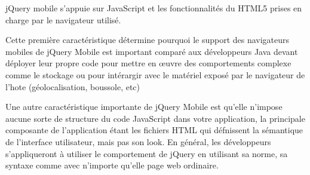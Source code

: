 jQuery mobile s’appuie sur JavaScript et les fonctionnalités du HTML5 prises en charge par le navigateur utilisé.

Cette première caractéristique détermine pourquoi le support des navigateurs mobiles de jQuery Mobile est important comparé aux développeurs Java devant déployer leur propre code pour mettre en œuvre des comportements complexe comme le stockage ou pour intérargir avec le matériel exposé par le navigateur de l’hote (géolocalisation, boussole, etc)

Une autre caractéristique importante de jQuery Mobile est qu’elle n’impose aucune sorte de structure du code JavaScript dans votre application, la principale composante de l’application étant les fichiers HTML qui défnissent la sémantique de l’interface utilisateur, mais pas son look. En général, les développeurs s’appliqueront à utiliser le comportement de jQuery en utilisant sa norme, sa syntaxe comme avec n’importe qu’elle page web ordinaire.